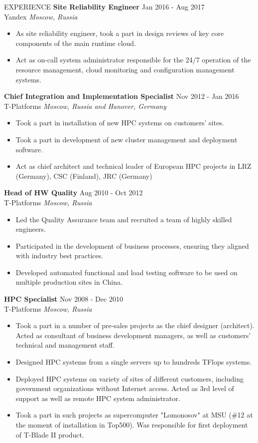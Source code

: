 \documentclass{resume} %
\begin{document}
\begin{rSection}{EXPERIENCE}
\textbf{Site Reliability Engineer} \hfill Jan 2016 - Aug 2017\\
Yandex \hfill \textit{Moscow, Russia}
\begin{itemize}
   \itemsep -3pt {}
   \item As site reliability engineer, took a part in design reviews of key core components of the main runtime cloud.
   \item Act as on-call system administrator responsible for the 24/7 operation of the resource management, cloud monitoring and configuration management systems.
\end{itemize}

\textbf{Chief Integration and Implementation Specialist} \hfill Nov 2012 - Jan 2016\\
T-Platforms \hfill \textit{Moscow, Russia and Hanover, Germany}
\begin{itemize}
   \itemsep -3pt {}
   \item Took a part in installation of new HPC systems on customers' sites.
   \item Took a part in development of new cluster management and deployment software.
   \item Act as chief architect and technical leader of European HPC projects in LRZ (Germany), CSC (Finland), JRC (Germany)
\end{itemize}

\textbf{Head of HW Quality} \hfill Aug 2010 - Oct 2012\\
T-Platforms \hfill \textit{Moscow, Russia}
\begin{itemize}
   \itemsep -3pt {}
   \item Led the Quality Assurance team and recruited a team of highly skilled engineers.
   \item Participated in the development of business processes, ensuring they aligned with industry best practices.
   \item Developed automated functional and load testing software to be used on multiple production sites in China.
\end{itemize}

\textbf{HPC Specialist} \hfill Nov 2008 - Dec 2010\\
T-Platforms \hfill \textit{Moscow, Russia}
 \begin{itemize}
    \itemsep -3pt {}
    \item Took a part in a number of pre-sales projects as the chief designer (architect). Acted as consultant of business development managers, as well as customers' technical and management staff.
    \item Designed HPC systems from a single servers up to hundreds TFlops systems.
    \item Deployed HPC systems on variety of sites of different customers, including government organizations without Internet access. Acted as 3rd level of support as well as remote HPC system administrator.
    \item Took a part in such projects as supercomputer "Lomonosov" at MSU (\#12 at the moment of installation in Top500). Was responsible for first deployment of T-Blade II product.
 \end{itemize}


\end{rSection}
\end{document}
